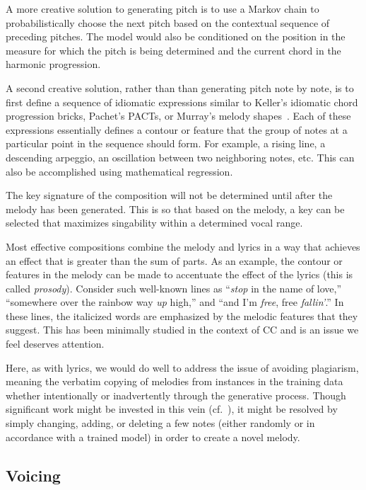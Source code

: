 \documentclass[11pt,phd]{byuprop}
\begin{document}
A more creative solution to generating pitch is to use a Markov chain to probabilistically choose the next pitch based on the contextual sequence of preceding pitches. The model would also be conditioned on the position in the measure for which the pitch is being determined and the current chord in the harmonic progression.

A second creative solution, rather than than generating pitch note by note, is to first define a sequence of idiomatic expressions similar to Keller's idiomatic chord progression bricks, Pachet's PACTs, or Murray's melody shapes~\cite {keller2013automating,pachet1991representing,murray2012algorithmically}. Each of these expressions essentially defines a contour or feature that the group of notes at a particular point in the sequence should form. For example, a rising line, a descending arpeggio, an oscillation between two neighboring notes, etc. This can also be accomplished using mathematical regression. 

The key signature of the composition will not be determined until after the melody has been generated. This is so that based on the melody, a key can be selected that maximizes singability within a determined vocal range.

Most effective compositions combine the melody and lyrics in a way that achieves an effect that is greater than the sum of parts. As an example, the contour or features in the melody can be made to accentuate the effect of the lyrics (this is called \emph{prosody}). Consider such well-known lines as ``\emph{stop} in the name of love,'' ``somewhere over the rainbow way \emph{up} high,'' and ``and I'm \emph{free}, free \emph{fallin'}.'' In these lines, the italicized words are emphasized by the melodic features that they suggest. This has been minimally studied in the context of CC and is an issue we feel deserves attention.

Here, as with lyrics, we would do well to address the issue of avoiding plagiarism, meaning the verbatim copying of melodies from instances in the training data whether intentionally or inadvertently through the generative process. Though significant work might be invested in this vein (cf.~\cite{papadopoulos1999ai}), it might be resolved by simply changing, adding, or deleting a few notes (either randomly or in accordance with a trained model) in order to create a novel melody.

\subsection{Voicing}
\end{document}
